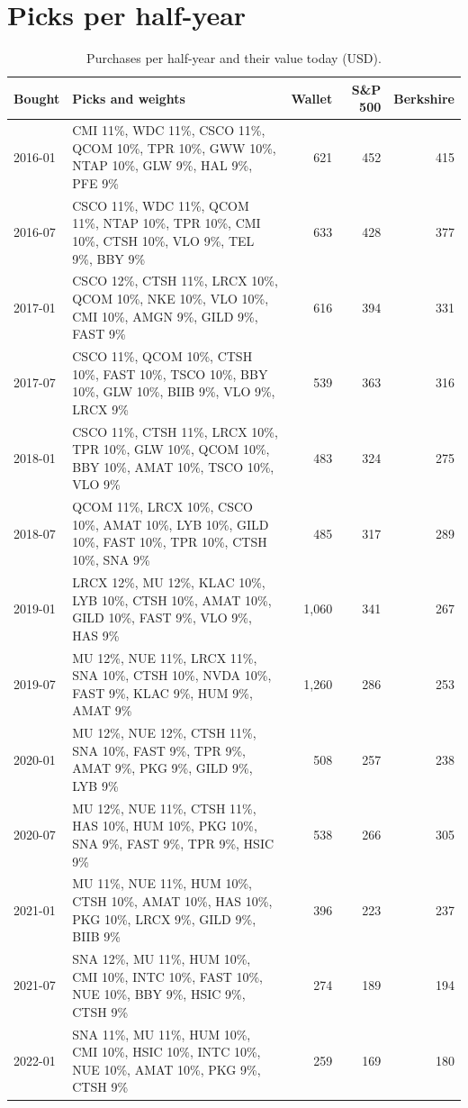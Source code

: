 \documentclass[11pt,a4paper]{article}
\begin{document}
\section{Picks per half-year}
\begin{table}[H]
\centering
\small
\caption{Purchases per half-year and their value today (USD).}\label{tab:picks}
\begin{tabular}{l p{9.2cm} r r r }
\hline
Bought & Picks and weights & Wallet & S\&P 500 & Berkshire \\
\hline
2016-01 & CMI 11\%, WDC 11\%, CSCO 11\%, QCOM 10\%, TPR 10\%, GWW 10\%, NTAP 10\%, GLW 9\%, HAL 9\%, PFE 9\% & 621 & 452 & 415 \\
2016-07 & CSCO 11\%, WDC 11\%, QCOM 11\%, NTAP 10\%, TPR 10\%, CMI 10\%, CTSH 10\%, VLO 9\%, TEL 9\%, BBY 9\% & 633 & 428 & 377 \\
2017-01 & CSCO 12\%, CTSH 11\%, LRCX 10\%, QCOM 10\%, NKE 10\%, VLO 10\%, CMI 10\%, AMGN 9\%, GILD 9\%, FAST 9\% & 616 & 394 & 331 \\
2017-07 & CSCO 11\%, QCOM 10\%, CTSH 10\%, FAST 10\%, TSCO 10\%, BBY 10\%, GLW 10\%, BIIB 9\%, VLO 9\%, LRCX 9\% & 539 & 363 & 316 \\
2018-01 & CSCO 11\%, CTSH 11\%, LRCX 10\%, TPR 10\%, GLW 10\%, QCOM 10\%, BBY 10\%, AMAT 10\%, TSCO 10\%, VLO 9\% & 483 & 324 & 275 \\
2018-07 & QCOM 11\%, LRCX 10\%, CSCO 10\%, AMAT 10\%, LYB 10\%, GILD 10\%, FAST 10\%, TPR 10\%, CTSH 10\%, SNA 9\% & 485 & 317 & 289 \\
2019-01 & LRCX 12\%, MU 12\%, KLAC 10\%, LYB 10\%, CTSH 10\%, AMAT 10\%, GILD 10\%, FAST 9\%, VLO 9\%, HAS 9\% & 1,060 & 341 & 267 \\
2019-07 & MU 12\%, NUE 11\%, LRCX 11\%, SNA 10\%, CTSH 10\%, NVDA 10\%, FAST 9\%, KLAC 9\%, HUM 9\%, AMAT 9\% & 1,260 & 286 & 253 \\
2020-01 & MU 12\%, NUE 12\%, CTSH 11\%, SNA 10\%, FAST 9\%, TPR 9\%, AMAT 9\%, PKG 9\%, GILD 9\%, LYB 9\% & 508 & 257 & 238 \\
2020-07 & MU 12\%, NUE 11\%, CTSH 11\%, HAS 10\%, HUM 10\%, PKG 10\%, SNA 9\%, FAST 9\%, TPR 9\%, HSIC 9\% & 538 & 266 & 305 \\
2021-01 & MU 11\%, NUE 11\%, HUM 10\%, CTSH 10\%, AMAT 10\%, HAS 10\%, PKG 10\%, LRCX 9\%, GILD 9\%, BIIB 9\% & 396 & 223 & 237 \\
2021-07 & SNA 12\%, MU 11\%, HUM 10\%, CMI 10\%, INTC 10\%, FAST 10\%, NUE 10\%, BBY 9\%, HSIC 9\%, CTSH 9\% & 274 & 189 & 194 \\
2022-01 & SNA 11\%, MU 11\%, HUM 10\%, CMI 10\%, HSIC 10\%, INTC 10\%, NUE 10\%, AMAT 10\%, PKG 9\%, CTSH 9\% & 259 & 169 & 180 \\

\end{tabular}
\end{table}
\end{document}
